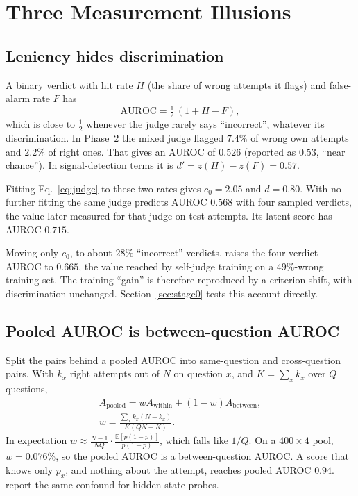 \section{Three Measurement Illusions}
\label{sec:illusions}

\subsection{Leniency hides discrimination}
\label{sec:lenient}

A binary verdict with hit rate $H$ (the share of wrong attempts it flags) and false-alarm rate $F$ has
\begin{equation}
\mathrm{AUROC}=\tfrac12\,(1+H-F),
\end{equation}
which is close to $\tfrac12$ whenever the judge rarely says ``incorrect'', whatever its discrimination. In Phase~2
the mixed judge flagged $7.4\%$ of wrong own attempts and $2.2\%$ of right ones. That gives an AUROC of $0.526$ (reported
as $0.53$, ``near chance''). In signal-detection terms it is $d'=z(H)-z(F)=0.57$.

Fitting Eq.~\ref{eq:judge} to these two rates gives $c_0=2.05$ and $d=0.80$. With no further fitting the same judge
predicts AUROC $0.568$ with four sampled verdicts, the value later measured for that judge on test attempts. Its
latent score has AUROC $0.715$.

Moving only $c_0$, to about $28\%$ ``incorrect'' verdicts, raises the four-verdict AUROC to $0.665$, the value
reached by self-judge training on a $49\%$-wrong training set. The training ``gain'' is therefore reproduced by a
criterion shift, with discrimination unchanged. Section~\ref{sec:stage0} tests this account directly.

\subsection{Pooled AUROC is between-question AUROC}
\label{sec:pooled}

Split the pairs behind a pooled AUROC into same-question and cross-question pairs. With $k_x$ right attempts out of
$N$ on question $x$, and $K=\sum_x k_x$ over $Q$ questions,
\begin{equation}
\begin{gathered}
A_{\text{pooled}} = w A_{\text{within}} + (1-w) A_{\text{between}},\\
w=\frac{\sum_x k_x(N-k_x)}{K(QN-K)}.
\end{gathered}
\end{equation}
In expectation
$w\approx\frac{N-1}{NQ}\cdot\frac{\mathbb E[p(1-p)]}{\bar p(1-\bar p)}$, which falls like $1/Q$. On a $400\times4$
pool, $w=0.076\%$, so the pooled AUROC is a between-question AUROC. A score that knows only $p_x$, and nothing about
the attempt, reaches pooled AUROC $0.94$. \citet{bulut2026problem} report the same confound for hidden-state probes.

